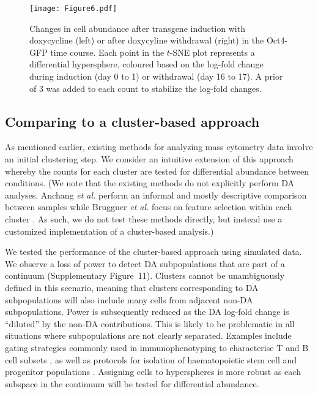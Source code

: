 \documentclass{article}
\newcommand{\suppfigclustersim}{11}
\begin{document}
\begin{figure}[bt]
    \begin{center}
        \texttt{[image: Figure6.pdf]}
    \end{center}
    \caption{
        Changes in cell abundance after transgene induction with doxycycline (left) or after doxycyline withdrawal (right) in the Oct4-GFP time course.
        Each point in the $t$-SNE plot represents a differential hypersphere, coloured based on the log-fold change during induction (day 0 to 1) or withdrawal (day 16 to 17).
        A prior of 3 was added to each count to stabilize the log-fold changes.
    }
    \label{fig:importanttime}
\end{figure}

\subsection{Comparing to a cluster-based approach}
As mentioned earlier, existing methods for analyzing mass cytometry data involve an initial clustering step.
We consider an intuitive extension of this approach whereby the counts for each cluster are tested for differential abundance between conditions.
(We note that the existing methods do not explicitly perform DA analyses.
Anchang \textit{et al.} perform an informal and mostly descriptive comparison between samples \cite{anchang2016visualization} while Bruggner \textit{et al.} focus on feature selection within each cluster \cite{bruggner2014automated}.
As such, we do not test these methods directly, but instead use a customized implementation of a cluster-based analysis.)

We tested the performance of the cluster-based approach using simulated data.
We observe a loss of power to detect DA subpopulations that are part of a continuum (Supplementary Figure~\suppfigclustersim{}).
Clusters cannot be unambiguously defined in this scenario, meaning that clusters corresponding to DA subpopulations will also include many cells from adjacent non-DA subpopulations.
Power is subsequently reduced as the DA log-fold change is ``diluted'' by the non-DA contributions.
This is likely to be problematic in all situations where subpopulations are not clearly separated.
Examples include gating strategies commonly used in immunophenotyping to characterise T and B cell subsets \cite{finak2016standardizing}, as well as protocols for isolation of haematopoietic stem cell and progenitor populations \cite{wilson2015combined}.
Assigning cells to hyperspheres is more robust as each subspace in the continuum will be tested for differential abundance.
\end{document}
